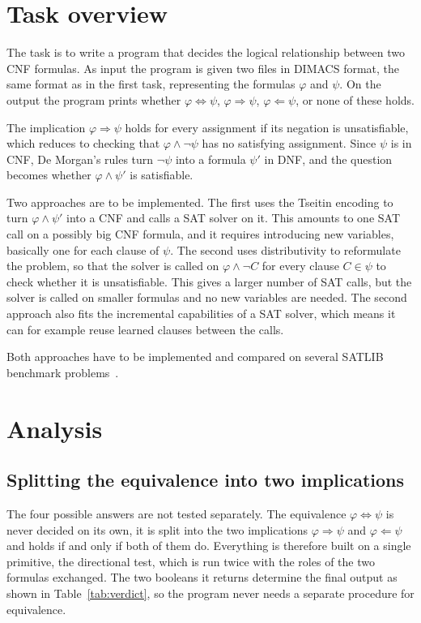 \documentclass[11pt,a4paper]{article}
\begin{document}
\makereporttitle

\section{Task overview}

The task is to write a program that decides the logical relationship between
two CNF formulas. As input the program is given two files in DIMACS format,
the same format as in the first task, representing the formulas $\varphi$ and
$\psi$. On the output the program prints whether
$\varphi \Leftrightarrow \psi$, $\varphi \Rightarrow \psi$,
$\varphi \Leftarrow \psi$, or none of these holds.

The implication $\varphi \Rightarrow \psi$ holds for every assignment if its negation
is unsatisfiable, which reduces to checking that $\varphi \wedge \neg \psi$
has no satisfying assignment. Since $\psi$ is in CNF, De Morgan's rules turn
$\neg \psi$ into a formula $\psi'$ in DNF, and the question becomes whether
$\varphi \wedge \psi'$ is satisfiable.

Two approaches are to be implemented. The first uses the Tseitin encoding to
turn $\varphi \wedge \psi'$ into a CNF and calls a SAT solver on it. This
amounts to one SAT call on a possibly big CNF formula, and it requires
introducing new variables, basically one for each clause of $\psi$. The
second uses distributivity to reformulate the problem, so that the solver is
called on $\varphi \wedge \neg C$ for every clause $C \in \psi$ to check
whether it is unsatisfiable. This gives a larger number of SAT calls, but the
solver is called on smaller formulas and no new variables are needed. The
second approach also fits the incremental capabilities of a SAT solver, which
means it can for example reuse learned clauses between the calls.

Both approaches have to be implemented and compared on several SATLIB
benchmark problems~\cite{satlib}.

\section{Analysis}

\subsection*{Splitting the equivalence into two implications}

The four possible answers are not tested separately. The equivalence
$\varphi \Leftrightarrow \psi$ is never decided on its own, it is split into
the two implications $\varphi \Rightarrow \psi$ and $\varphi \Leftarrow \psi$
and holds if and only if both of them do. Everything is therefore built on a
single primitive, the directional test, which is run twice with the roles of
the two formulas exchanged. The two booleans it returns determine the final
output as shown in Table~\ref{tab:verdict}, so the program never needs a
separate procedure for equivalence.
\end{document}
